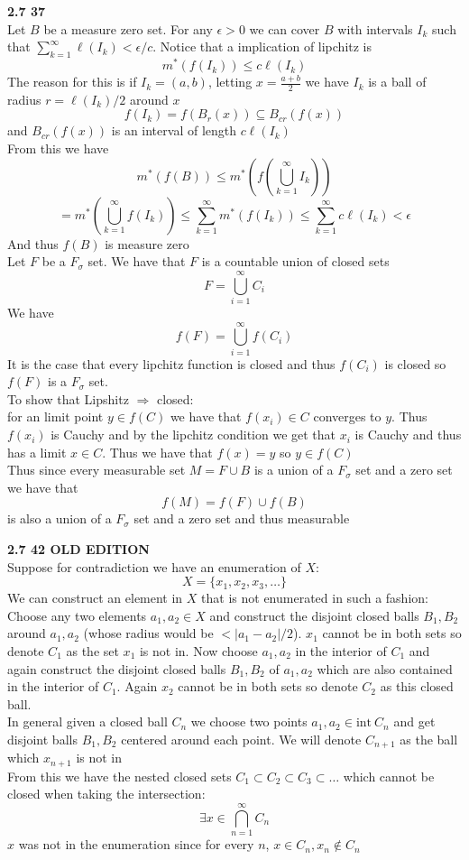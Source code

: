 \documentclass[12pt]{article}
\newenvironment{ques}[1]{\textbf{#1}\vspace{1 mm}\\ }{\bigskip}
\theoremstyle{definition}
\renewcommand{\l}{\left }
\renewcommand{\r}{\right }
\renewcommand{\i}{\text{int} \ }
\renewcommand{\-}{\backslash}
\begin{document}
\begin{ques}{2.7 37}
	Let $B$ be a measure zero set. For any $\epsilon > 0$ we can cover $B$ with
	intervals $I_k$ such that $\sum_{k =1} ^\infty \ell(I_k) < \epsilon / c$.
	Notice that a implication of lipchitz is
	$$m^*(f(I_k)) \leq c \ell(I_k)$$
	The reason for this is if $I_k = (a,b)$, letting $x = \frac{a + b}2$ we
	have $I_k$ is a ball of radius $r = \ell(I_k)/2$ around $x$
	$$f(I_k) = f(B_r(x)) \subseteq B_{cr}(f(x))$$
	and $B_{cr}(f(x))$ is an interval of length $c\ell(I_k)$
	\\
	From this we have
	$$m^*(f(B)) \leq m^*\l(f\l( \bigcup_{k=1}^\infty I_k \r)\r)$$
	$$= m^*\l( \bigcup_{k=1}^\infty f\l( I_k \r)\r) \leq \sum_{k=1}^\infty
	m^*(f(I_k)) \leq \sum_{k=1}^\infty c \ell(I_k) < \epsilon$$
	And thus $f(B)$ is measure zero\\
	Let $F$ be a $F_\sigma$ set. We have that $F$ is a countable union of closed sets
	$$F = \bigcup_{i=1}^\infty C_i$$
	We have
	$$f(F) = \bigcup_{i=1}^\infty f(C_i)$$
	It is the case that every lipchitz function is closed and thus $f(C_i)$ is
	closed so $f(F)$ is a $F_\sigma$ set.\\
	To show that Lipshitz $\Rightarrow$ closed:\\
	for an limit point $y \in f(C)$ we have that $f(x_i) \in C$ converges to
	$y$. Thus $f(x_i)$ is Cauchy and by the lipchitz condition we get that
	$x_i$ is Cauchy and thus has a limit $x \in C$. Thus we have that $f(x) = y$ so
	$y \in f(C)$\\
	Thus since every measurable set $M = F \cup B$ is a union of a
	$F_\sigma$ set and a zero set we have that
	$$f(M) = f(F) \cup f(B)$$
	is also a union of a $F_\sigma$ set and a zero set and thus measurable

\end{ques}

\begin{ques}{2.7 42 OLD EDITION}
	Suppose for contradiction we have an enumeration of $X:$
	$$X = \{x_1, x_2, x_3, \dots \}$$
	We can construct an element in $X$ that is not enumerated in such a fashion:\\
	Choose any two elements $a_1, a_2 \in X$ and construct the disjoint closed balls
	$B_1, B_2$ around $a_1, a_2$ (whose radius would be $< |a_1-a_2|/2$). $x_1$
	cannot be in both sets so denote $C_1$ as the set $x_1$ is not in. Now
	choose $a_1,a_2$ in the interior of $C_1$ and again construct the disjoint
	closed balls $B_1, B_2$ of $a_1,a_2$ which are also contained in the
	interior of $C_1$. Again $x_2$ cannot be in both sets so denote $C_2$ as
	this closed ball.\\
	In general given a closed ball $C_n$ we choose two
	points $a_1,a_2 \in \i C_n$ and get disjoint balls $B_1, B_2$ centered
	around each point. We will denote $C_{n+1}$ as the ball which $x_{n+1}$ is
	not in\\
	From this we have the nested closed sets $C_1 \subset C_2 \subset C_3
	\subset \dots$ which cannot be closed when taking the intersection:
	$$\exists x \in \bigcap_{n=1}^\infty C_n$$
	$x$ was not in the enumeration since for every $n$, $x \in C_n, x_n \notin C_n$
\end{ques}
\end{document}
